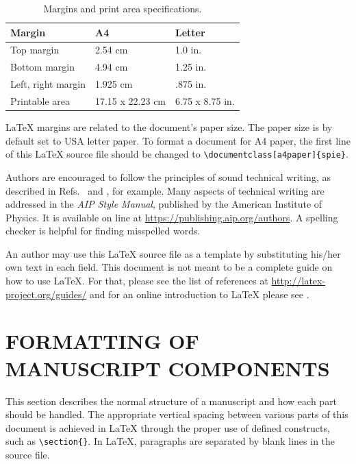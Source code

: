 \begin{table}[ht]
\caption{Margins and print area specifications.}
\label{tab:Paper Margins}
\begin{center}
\begin{tabular}{|l|l|l|}
\hline
\rule[-1ex]{0pt}{3.5ex}  Margin & A4 & Letter  \\
\hline
\rule[-1ex]{0pt}{3.5ex}  Top margin & 2.54 cm & 1.0 in.   \\
\hline
\rule[-1ex]{0pt}{3.5ex}  Bottom margin & 4.94 cm & 1.25 in.  \\
\hline
\rule[-1ex]{0pt}{3.5ex}  Left, right margin & 1.925 cm & .875 in.  \\
\hline
\rule[-1ex]{0pt}{3.5ex}  Printable area & 17.15 x 22.23 cm & 6.75 x 8.75 in.  \\
\hline
\end{tabular}
\end{center}
\end{table}

LaTeX margins are related to the document's paper size. The paper size is by default set to USA letter paper. To format a document for A4 paper, the first line of this LaTeX source file should be changed to \verb|\documentclass[a4paper]{spie}|.

Authors are encouraged to follow the principles of sound technical writing, as described in Refs.~ and , for example.  Many aspects of technical writing are addressed in the {\em AIP Style Manual}, published by the American Institute of Physics.  It is available on line at \url{https://publishing.aip.org/authors}. A spelling checker is helpful for finding misspelled words.

An author may use this LaTeX source file as a template by substituting his/her own text in each field.  This document is not meant to be a complete guide on how to use LaTeX.  For that, please see the list of references at \url{http://latex-project.org/guides/} and for an online introduction to LaTeX please see .

\section{FORMATTING OF MANUSCRIPT COMPONENTS}

This section describes the normal structure of a manuscript and how each part should be handled.  The appropriate vertical spacing between various parts of this document is achieved in LaTeX through the proper use of defined constructs, such as \verb|\section{}|.  In LaTeX, paragraphs are separated by blank lines in the source file.

